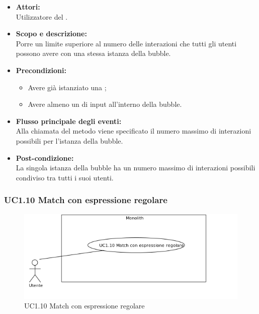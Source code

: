 \begin{itemize}
	\item \textbf{Attori:}
	\\Utilizzatore del .
	\item \textbf{Scopo e descrizione:} 
	\\Porre un limite superiore al numero delle interazioni che tutti gli utenti possono avere con una stessa istanza della bubble.
	\item \textbf{Precondizioni:}
	\begin{itemize}
		\item Avere già istanziato una ;
		\item Avere almeno un  di input all'interno della bubble.
	\end{itemize}
	\item \textbf{Flusso principale degli eventi:}
	\\Alla chiamata del metodo viene specificato il numero massimo di interazioni possibili per l’istanza della bubble.
	\item \textbf{Post-condizione:}
	\\La singola istanza della bubble ha un numero massimo di interazioni possibili condiviso tra tutti i suoi utenti. 
\end{itemize}

\subsubsection{UC1.10 Match con espressione regolare} \label{UC1.10}

\begin{figure}[H]
	\centering
	\includegraphics[width=15cm]{../../documenti/AnalisiDeiRequisiti/Diagrammi_img/uc1_10.png}
	\caption{UC1.10 Match con espressione regolare}
\end{figure}

